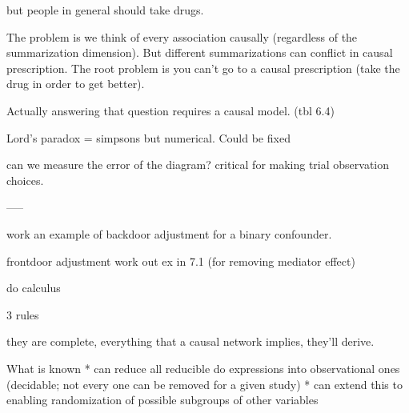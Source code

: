 \documentclass{article}
\begin{document}
but people in general should take drugs.

The problem is we think of every association causally (regardless of the summarization dimension). But different summarizations can conflict in causal prescription. The root problem is you can't go to a causal prescription (take the drug in order to get better).

Actually answering that question requires a causal model. (tbl 6.4)

Lord's paradox = simpsons but numerical. Could be fixed

can we measure the error of the diagram? critical for making trial observation choices.

-----

work an example of backdoor adjustment for a binary confounder.

frontdoor adjustment work out ex  in 7.1 (for removing mediator effect)



do calculus

3 rules

they are complete, everything that a causal network implies, they'll derive.

What is known
* can reduce all reducible  do expressions into observational ones (decidable; not every one can be removed for a given study)
* can extend this to enabling randomization of possible subgroups of other variables
\end{document}
